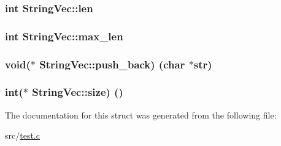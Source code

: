 \subsubsection[{\texorpdfstring{len}{len}}]{\setlength{\rightskip}{0pt plus 5cm}int String\+Vec\+::len}\hypertarget{struct_string_vec_a7c24f16a046318d0be2902e0b40f07e4}{}\label{struct_string_vec_a7c24f16a046318d0be2902e0b40f07e4}
\subsubsection[{\texorpdfstring{max\+\_\+len}{max_len}}]{\setlength{\rightskip}{0pt plus 5cm}int String\+Vec\+::max\+\_\+len}\hypertarget{struct_string_vec_a78df5c5f47656d385e2f6d1f2e9ed62b}{}\label{struct_string_vec_a78df5c5f47656d385e2f6d1f2e9ed62b}
\subsubsection[{\texorpdfstring{push\+\_\+back}{push_back}}]{\setlength{\rightskip}{0pt plus 5cm}void($\ast$  String\+Vec\+::push\+\_\+back) (char $\ast$str)}\hypertarget{struct_string_vec_a8034d98a50a5e9d365f40cf93a80f625}{}\label{struct_string_vec_a8034d98a50a5e9d365f40cf93a80f625}
\subsubsection[{\texorpdfstring{size}{size}}]{\setlength{\rightskip}{0pt plus 5cm}int($\ast$  String\+Vec\+::size) ()}\hypertarget{struct_string_vec_ab333b455c70e0234322232afe7b8ec24}{}\label{struct_string_vec_ab333b455c70e0234322232afe7b8ec24}


The documentation for this struct was generated from the following file\+:\begin{DoxyCompactItemize}
\item 
src/\hyperlink{test_8c}{test.\+c}\end{DoxyCompactItemize}
